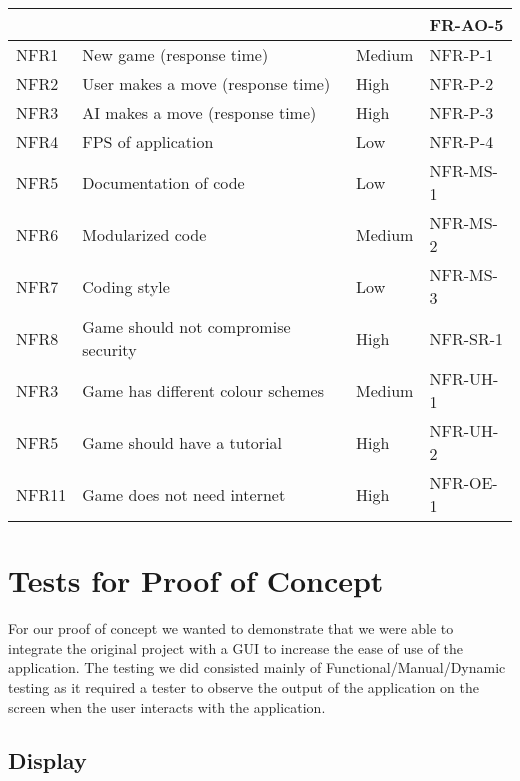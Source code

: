 \documentclass[12pt, titlepage]{article}
\begin{document}
\begin{table}[H]
\begin{center}
\begin{adjustwidth}{-1.5cm}{}
\begin{tabularx}{1.2\textwidth}{|p{3.4cm}|p{7cm}|p{1.6cm}|X|}
	     &  &  & FR-AO-5\\
		\hline
		\hline
		NFR1 & New game (response time) & Medium & NFR-P-1 \\
		\hline
		NFR2 & User makes a move (response time) & High & NFR-P-2 \\
		\hline
		NFR3 & AI makes a move (response time) & High & NFR-P-3 \\
		\hline
		NFR4 & FPS of application & Low & NFR-P-4 \\
		\hline
		NFR5 & Documentation of code & Low & NFR-MS-1 \\
		\hline
		NFR6 & Modularized code & Medium & NFR-MS-2 \\
		\hline
		NFR7 & Coding style & Low & NFR-MS-3 \\
		\hline
		NFR8 & Game should not compromise security & High & NFR-SR-1 \\
		\hline
		NFR3 & Game has different colour schemes & Medium & NFR-UH-1\\
		\hline
		NFR5 & Game should have a tutorial & High & NFR-UH-2\\
		\hline
		NFR11 & Game does not need internet & High & NFR-OE-1\\
		\hline
	\end{tabularx}
	\end{adjustwidth}
	\end{center}
\end{table}

\newpage
\section{Tests for Proof of Concept}
For our proof of concept we wanted to demonstrate that we were able to integrate the original project with a GUI to increase the ease of use of the application. The testing we did consisted mainly of Functional/Manual/Dynamic testing as it required a tester to observe the output of the application on the screen when the user interacts with the application.

\subsection{Display}
		
\end{document}
